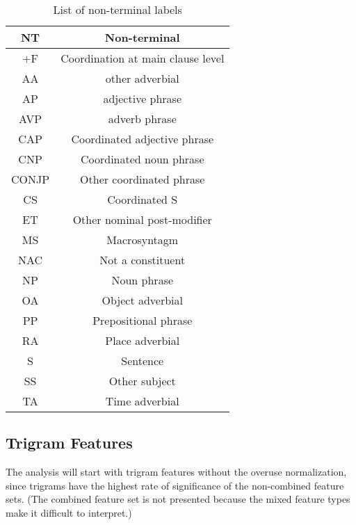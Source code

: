 \begin{table}
  \begin{tabular}{c|c}
    NT & Non-terminal \\ \hline
     $+$F & Coordination at main clause level \\
     AA & other adverbial \\
     AP & adjective phrase \\
     AVP & adverb phrase \\
     CAP & Coordinated adjective phrase \\
     CNP & Coordinated noun phrase \\
     CONJP & Other coordinated phrase \\
     CS & Coordinated S \\
     ET & Other nominal post-modifier \\
     MS & Macrosyntagm \\
     NAC & Not a constituent \\
     NP & Noun phrase \\
     OA & Object adverbial \\
     PP & Prepositional phrase \\
     RA & Place adverbial \\
     S & Sentence \\
     SS & Other subject \\
     TA & Time adverbial \\ \hline
   \end{tabular}
   \vspace{5mm}
    \caption{List of non-terminal labels}
    \label{nonterminal-list}
\end{table}

\subsection{Trigram Features}
\label{feature-ranking-complete}

The analysis will start with trigram features without the overuse
normalization, since trigrams have the highest rate of significance of
the non-combined feature sets. (The combined feature set is not
presented because the mixed feature types make it difficult to
interpret.)


